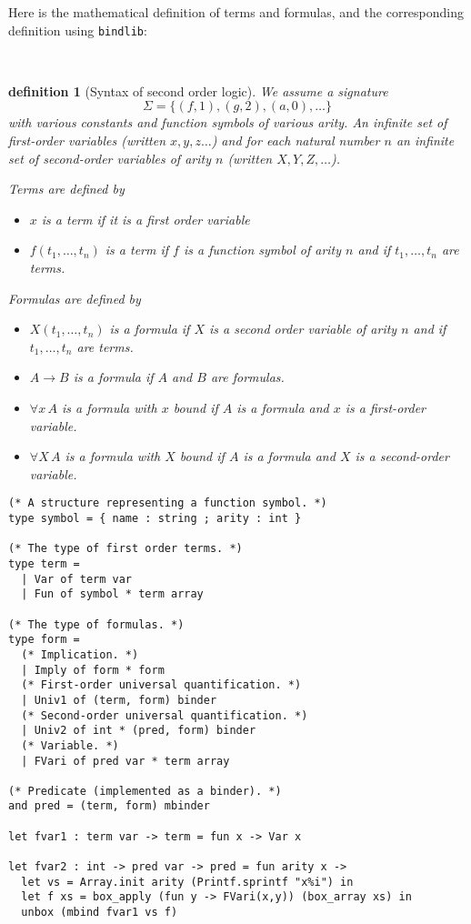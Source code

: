 \documentclass[11pt]{article}
\begin{document}
Here is the mathematical definition of terms and formulas, and the
corresponding definition using \verb#bindlib#:

\newtheorem{definition}{definition}\
\begin{definition}[Syntax of second order logic]\rm
We assume a signature
$$\Sigma = \{(f,1), (g,2), (a,0), \dots\}$$ with various
constants and function symbols of
various arity. An infinite set of first-order variables (written
$x,y,z\dots$) and for each natural number $n$ an infinite set of
second-order variables of arity $n$ (written $X,Y,Z,\dots$).

Terms are defined by
\begin{itemize}
\item $x$ is a term if it is a first order variable
\item $f(t_1,\dots,t_n)$ is a term if $f$ is a function symbol of
arity $n$ and if $t_1,\dots,t_n$ are terms.
\end{itemize}

Formulas are defined by
\begin{itemize}
\item $X(t_1,\dots,t_n)$ is a formula if $X$ is a second order variable of
arity $n$ and if $t_1,\dots,t_n$ are terms.
\item $A \to B$ is a formula if $A$ and $B$ are formulas.
\item $\forall x\,A$ is a formula with $x$ bound if $A$ is a formula
and $x$ is a first-order variable.
\item $\forall X\,A$ is a formula with $X$ bound if $A$ is a formula
and $X$ is a second-order variable.
\end{itemize}
\end{definition}

\begin{verbatim}
(* A structure representing a function symbol. *)
type symbol = { name : string ; arity : int }

(* The type of first order terms. *)
type term =
  | Var of term var
  | Fun of symbol * term array

(* The type of formulas. *)
type form =
  (* Implication. *)
  | Imply of form * form
  (* First-order universal quantification. *)
  | Univ1 of (term, form) binder
  (* Second-order universal quantification. *)
  | Univ2 of int * (pred, form) binder
  (* Variable. *)
  | FVari of pred var * term array

(* Predicate (implemented as a binder). *)
and pred = (term, form) mbinder

let fvar1 : term var -> term = fun x -> Var x

let fvar2 : int -> pred var -> pred = fun arity x ->
  let vs = Array.init arity (Printf.sprintf "x%i") in
  let f xs = box_apply (fun y -> FVari(x,y)) (box_array xs) in
  unbox (mbind fvar1 vs f)
\end{verbatim}
\end{document}
